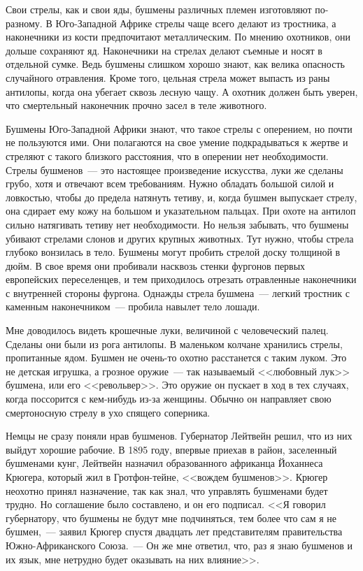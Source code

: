 \documentclass[12pt,a4paper,twoside,openany,svgnames]{memoir}
\begin{document}
Свои стрелы, как и свои яды, бушмены различных племен изготовляют по-разному. В Юго-Западной Африке стрелы чаще всего делают из тростника, а наконечники из кости предпочитают металлическим. По мнению охотников, они дольше сохраняют яд. Наконечники на стрелах делают съемные и носят в отдельной сумке. Ведь бушмены слишком хорошо знают, как велика опасность случайного отравления. Кроме того, цельная стрела может выпасть из раны антилопы, когда она убегает сквозь лесную чащу. А охотник должен быть уверен, что смертельный наконечник прочно засел в теле животного.

Бушмены Юго-Западной Африки знают, что такое стрелы с оперением, но почти не пользуются ими. Они полагаются на свое умение подкрадываться к жертве и стреляют с такого близкого расстояния, что в оперении нет необходимости. Стрелы бушменов~--- это настоящее произведение искусства, луки же сделаны грубо, хотя и отвечают всем требованиям. Нужно обладать большой силой и ловкостью, чтобы до предела натянуть тетиву, и, когда бушмен выпускает стрелу, она сдирает ему кожу на большом и указательном пальцах. При охоте на антилоп сильно натягивать тетиву нет необходимости. Но нельзя забывать, что бушмены убивают стрелами слонов и других крупных животных. Тут нужно, чтобы стрела глубоко вонзилась в тело. Бушмены могут пробить стрелой доску толщиной в дюйм. В свое время они пробивали насквозь стенки фургонов первых европейских переселенцев, и тем приходилось отрезать отравленные наконечники с внутренней стороны фургона. Однажды стрела бушмена~--- легкий тростник с каменным наконечником~--- пробила навылет тело лошади.

Мне доводилось видеть крошечные луки, величиной с человеческий палец. Сделаны они были из рога антилопы. В маленьком колчане хранились стрелы, пропитанные ядом. Бушмен не очень-то охотно расстанется с таким луком. Это не детская игрушка, а грозное оружие~--- так называемый <<любовный лук>> бушмена, или его <<револьвер>>. Это оружие он пускает в ход в тех случаях, когда поссорится с кем-нибудь из-за женщины. Обычно он направляет свою смертоносную стрелу в ухо спящего соперника.

Немцы не сразу поняли нрав бушменов. Губернатор Лейтвейн решил, что из них выйдут хорошие рабочие. В 1895 году, впервые приехав в район, заселенный бушменами кунг, Лейтвейн назначил образованного африканца Йоханнеса Крюгера, который жил в Гротфон-тейне, <<вождем бушменов>>. Крюгер неохотно принял назначение, так как знал, что управлять бушменами будет трудно. Но соглашение было составлено, и он его подписал. <<Я говорил губернатору, что бушмены не будут мне подчиняться, тем более что сам я не бушмен,~--- заявил Крюгер спустя двадцать лет представителям правительства Южно-Африканского Союза.~--- Он же мне ответил, что, раз я знаю бушменов и их язык, мне нетрудно будет оказывать на них влияние>>.
\end{document}
